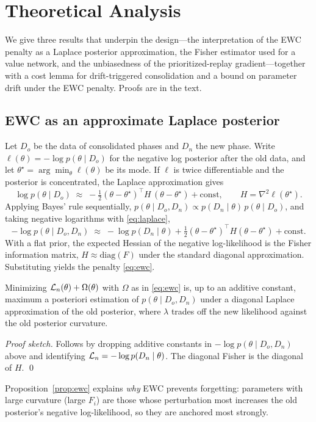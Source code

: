 \section{Theoretical Analysis}
\label{sec:theory}

We give three results that underpin the design---the interpretation of the EWC
penalty as a Laplace posterior approximation, the Fisher estimator used for a
value network, and the unbiasedness of the prioritized-replay gradient---together
with a cost lemma for drift-triggered consolidation and a bound on parameter
drift under the EWC penalty. Proofs are in the text.

\subsection{EWC as an approximate Laplace posterior}
Let \(D_o\) be the data of consolidated phases and \(D_n\) the new phase. Write
\(\ell(\theta) = -\log p(\theta\mid D_o)\) for the negative log posterior after
the old data, and let \(\theta^\star = \arg\min_\theta \ell(\theta)\) be its
mode. If \(\ell\) is twice differentiable and the posterior is concentrated, the
Laplace approximation gives
\begin{equation}
  \log p(\theta\mid D_o) \;\approx\; -\tfrac12(\theta-\theta^\star)^\top H\,(\theta-\theta^\star) + \text{const},
  \qquad H = \nabla^2 \ell(\theta^\star).
  \label{eq:laplace}
\end{equation}
Applying Bayes' rule sequentially,
\(p(\theta\mid D_o, D_n) \propto p(D_n\mid\theta)\,p(\theta\mid D_o)\), and taking
negative logarithms with \eqref{eq:laplace},
\begin{equation}
  -\log p(\theta\mid D_o,D_n) \;\approx\;
  -\log p(D_n\mid\theta) + \tfrac12(\theta-\theta^\star)^\top H(\theta-\theta^\star) + \text{const}.
\end{equation}
With a flat prior, the expected Hessian of the negative log-likelihood is the
Fisher information matrix, \(H \approx \mathrm{diag}(F)\) under the standard
diagonal approximation. Substituting yields the penalty \eqref{eq:ewc}.

\begin{proposition}[EWC \(=\) penalized MAP]
\label{prop:ewc}
Minimizing \(\mathcal{L}_n(\theta) + \Omega(\theta)\) with \(\Omega\) as in
\eqref{eq:ewc} is, up to an additive constant, maximum a posteriori estimation of
\(p(\theta\mid D_o, D_n)\) under a diagonal Laplace approximation of the old
posterior, where \(\lambda\) trades off the new likelihood against the old
posterior curvature.
\end{proposition}
\begin{proof}[Proof sketch]
Follows by dropping additive constants in
\(-\log p(\theta\mid D_o,D_n)\) above and identifying
\(\mathcal{L}_n=-\log p(D_n\mid\theta)\). The diagonal Fisher is the diagonal of
\(H\). \qed
\end{proof}
Proposition~\ref{prop:ewc} explains \emph{why} EWC prevents forgetting: parameters
with large curvature (large \(F_i\)) are those whose perturbation most increases
the old posterior's negative log-likelihood, so they are anchored most strongly.

